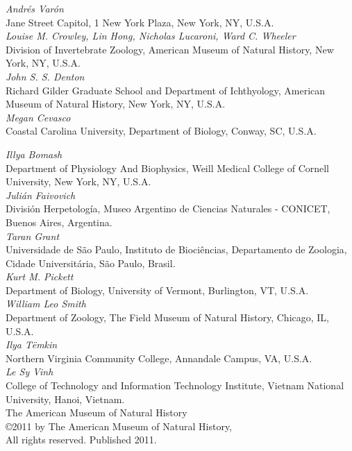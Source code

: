 \documentclass[11pt]{book}
\begin{document}
\begin{flushleft}
    \small
{\it
Andr\'es Var\'on}\\
Jane Street Capitol, 1 New York Plaza, New York, NY, U.S.A. \\
\smallskip 
{\it
Louise M. Crowley, Lin Hong, Nicholas Lucaroni, Ward C. Wheeler \\
}
Division of Invertebrate Zoology, American Museum of Natural History, New York, NY, U.S.A.\\
\smallskip
{\it
John S. S. Denton\\
}
Richard Gilder Graduate School and Department of Ichthyology, American Museum of Natural History, New York, NY, U.S.A.\\
\smallskip
{\it
Megan Cevasco} \\
Coastal Carolina University, Department of Biology, Conway, SC, U.S.A. \\
\vspace*{1.15cm}


{\it
Illya Bomash}\\
Department of Physiology And Biophysics, Weill Medical College of Cornell University, New York, NY, U.S.A.\\
\smallskip
{\it
Juli\'an Faivovich}\\
Divisi\'on Herpetolog\'ia, Museo Argentino de Ciencias Naturales - CONICET, Buenos Aires, Argentina.\\
\smallskip
{\it
Taran Grant}\\
Universidade de S\~{a}o Paulo, Instituto de Bioci\^{e}ncias, Departamento de Zoologia, Cidade Universit\'aria, 
S\~{a}o Paulo, Brasil.\\
\smallskip
{\it
Kurt M. Pickett}\\
Department of Biology, University of Vermont, Burlington, VT, U.S.A. \\
\smallskip
{\it
William Leo Smith}\\
Department of Zoology, The Field Museum of Natural History, Chicago, IL, U.S.A.\\
\smallskip
{\it
Ilya T\"emkin} \\
Northern Virginia Community College, Annandale Campus, VA, U.S.A. \\
\smallskip
{\it
Le Sy Vinh}\\
College of Technology and Information Technology Institute, Vietnam National University, Hanoi, Vietnam.  \\

\vspace*{1.15cm}
The American Museum of Natural History\\
\copyright 2011 by The American Museum of Natural History, \\
All rights reserved. Published 2011.


\end{flushleft}
\end{document}
